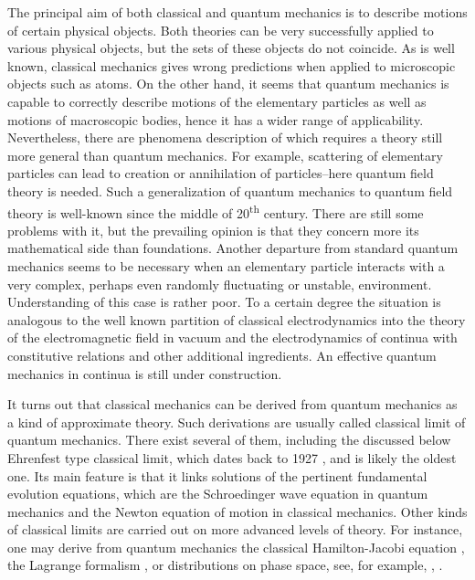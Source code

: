 \documentclass[12pt]{article}
\begin{document}
The principal aim of both classical and quantum mechanics is to describe motions of certain physical objects. Both theories can be very successfully applied to various physical objects, but the sets of these objects do not coincide. As is well known, classical mechanics gives wrong predictions when applied to microscopic objects such as atoms. On the other hand, it seems that quantum mechanics is capable to correctly describe motions of the elementary particles as well as motions of macroscopic bodies, hence it has a wider range of applicability. Nevertheless, there are phenomena description of which requires a theory still more general than quantum mechanics. For example, scattering of elementary particles can lead to creation or annihilation of particles--here quantum field theory is needed. Such a generalization of quantum mechanics to quantum field theory is well-known since the middle of 20\textsuperscript{th} century. There are still some problems with it, but the prevailing opinion is that they concern more its mathematical side than foundations. Another departure from standard quantum mechanics seems to be necessary when an elementary particle interacts with a very complex, perhaps even randomly fluctuating or unstable, environment. Understanding of this case is rather poor. To a certain degree the situation is analogous to the well known partition of classical electrodynamics into the theory of the electromagnetic field in vacuum and the electrodynamics of 
continua with constitutive relations and other additional ingredients. An effective quantum mechanics in continua is still 
under construction. 





 It turns out that classical mechanics can be derived from quantum mechanics as a kind of approximate theory. Such derivations are usually called classical limit of quantum mechanics. There exist several of them, including the discussed below Ehrenfest type classical limit, which dates back to 1927 \cite{ehr}, and is likely the oldest one. Its main feature is that it links solutions of the pertinent fundamental evolution equations, which are the Schroedinger wave equation in quantum mechanics and the Newton equation of motion in classical mechanics. Other kinds of classical limits are carried out on more advanced levels of theory. For instance, one may derive from quantum mechanics the classical Hamilton-Jacobi equation \cite{WKB}, the Lagrange formalism \cite{pathint}, or distributions on phase space, see, for example, \cite{siegel}, \cite{wignerdistr}. 
\end{document}
